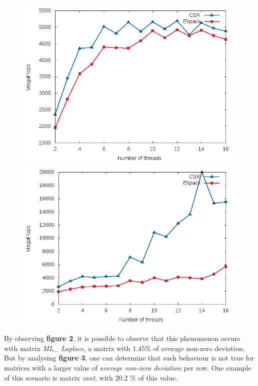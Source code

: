 \documentclass[12pt]{article}
\begin{document}
\begin{figure}[!htb]
\centering
\begin{minipage}{.5\textwidth}
  \centering
  \includegraphics[width=.8\linewidth]{OMP_ML_Laplace.png}
\end{minipage}%
\begin{minipage}{.5\textwidth}
  \centering
  \includegraphics[width=.8\linewidth]{OMP_cant.png}
\end{minipage}
\end{figure}

By observing \textbf{figure 2}, it is possible to observe that this phenomenon occurs with matrix \textit{ML\_ Laplace}, a matrix with $1.45 $\% of average non-zero deviation. But by analysing \textbf{figure 3}, one can determine that such behaviour is not true for matrices with a larger value of \textit{average non-zero deviation} per row. One example of this scenario is matrix \textit{cant}, with $20.2$ \% of this value.
\end{document}
